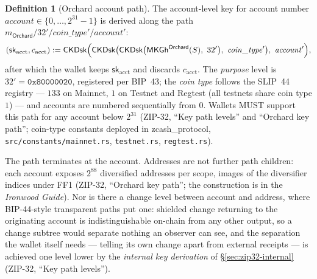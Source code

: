 \documentclass[11pt,a4paper]{article}
\theoremstyle{definition}
\newtheorem{definition}[theorem]{Definition}
\begin{document}
\begin{definition}[Orchard account path]\label{def:zip32-path}
The account-level key for account number
$\mathit{account} \in \{0, \dots, 2^{31}-1\}$ is derived along the path
$m_{\mathsf{Orchard}} / 32' / \mathit{coin\_type}' / \mathit{account}'$:
\[
(\mathsf{sk}_{\mathrm{acct}}, c_{\mathrm{acct}}) :=
\mathsf{CKDsk}\Bigl(\mathsf{CKDsk}\bigl(\mathsf{CKDsk}\bigl(
\mathsf{MKGh}^{\mathsf{Orchard}}(S),\ 32'\bigr),\
\mathit{coin\_type}'\bigr),\ \mathit{account}'\Bigr),
\]
after which the wallet keeps $\mathsf{sk}_{\mathrm{acct}}$ and discards
$c_{\mathrm{acct}}$. The \emph{purpose} level is
$32' = \mathtt{0x80000020}$, registered per BIP~43; the
\emph{coin type} follows the SLIP~44 registry --- $133$ on Mainnet, $1$ on
Testnet and Regtest (all testnets share coin type $1$) --- and accounts are
numbered sequentially from $0$. Wallets MUST support this path for any
account below $2^{31}$ (ZIP-32, ``Key path levels'' and ``Orchard key
path''; coin-type constants deployed in \textsf{zcash\_protocol},
\texttt{src/constants/mainnet.rs}, \texttt{testnet.rs},
\texttt{regtest.rs}).
\end{definition}

The path terminates at the account. Addresses are not further path
children: each account exposes $2^{88}$ diversified addresses per scope,
images of the diversifier indices under FF1 (ZIP-32, ``Orchard key path'';
the construction is in the \emph{Ironwood Guide}). Nor is there a change
level between account and address, where BIP-44-style transparent paths put
one: shielded change returning to the originating account is
indistinguishable on-chain from any other output, so a change subtree would
separate nothing an observer can see, and the separation the wallet itself
needs --- telling its own change apart from external receipts --- is
achieved one level lower by the \emph{internal key derivation} of
\S\ref{sec:zip32-internal} (ZIP-32, ``Key path levels'').
\end{document}
